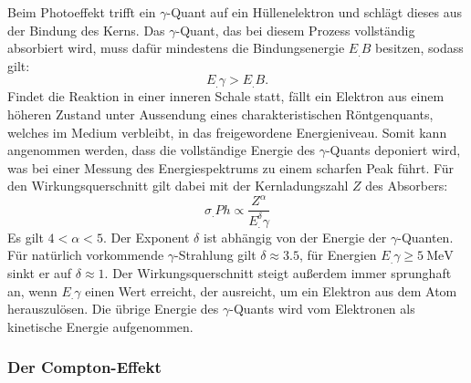 Beim Photoeffekt trifft ein $\gamma$-Quant auf ein Hüllenelektron und schlägt dieses aus der Bindung des Kerns. Das $\gamma$-Quant, das bei diesem Prozess vollständig absorbiert wird, muss dafür mindestens die Bindungsenergie $E_.B$ besitzen, sodass gilt:
\[
E_.{\gamma}>E_.B\text{.}
\]
Findet die Reaktion in einer inneren Schale statt, fällt ein Elektron aus einem höheren Zustand unter Aussendung eines charakteristischen Röntgenquants, welches im Medium verbleibt, in das freigewordene Energieniveau. Somit kann angenommen werden, dass die vollständige Energie des $\gamma$-Quants deponiert wird, was bei einer Messung des Energiespektrums zu einem scharfen Peak führt.
Für den Wirkungsquerschnitt gilt dabei mit der Kernladungszahl $Z$ des Absorbers:
\[
\sigma_.{Ph}\propto\frac{Z^{\alpha}}{E^{\delta}_.{\gamma}}
\]
Es gilt $4 < \alpha < 5$.  Der Exponent $\delta$ ist abhängig von der Energie der $\gamma$-Quanten. Für natürlich vorkommende $\gamma$-Strahlung gilt $\delta\approx \num{3.5}$, für Energien $E_.{\gamma}\geq \SI{5}{\mega\electronvolt}$ sinkt er auf $\delta\approx 1$.
Der Wirkungsquerschnitt steigt außerdem immer sprunghaft an, wenn $E_.{\gamma}$ einen Wert erreicht, der ausreicht, um ein Elektron aus dem Atom herauszulösen. Die übrige Energie des $\gamma$-Quants wird vom Elektronen als kinetische Energie aufgenommen.

\subsubsection{Der Compton-Effekt}

